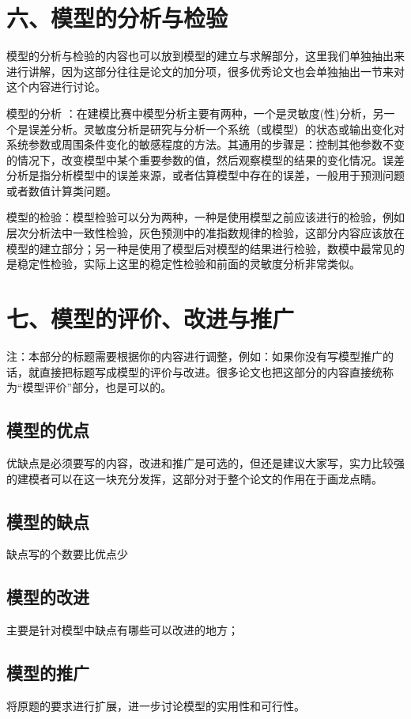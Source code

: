 \documentclass{my_paper}
\begin{document}
\section{六、模型的分析与检验}

模型的分析与检验的内容也可以放到模型的建立与求解部分，这里我们单独抽出来进行讲解，因为这部分往往是论文的加分项，很多优秀论文也会单独抽出一节来对这个内容进行讨论。

模型的分析 ：在建模比赛中模型分析主要有两种，一个是灵敏度(性)分析，另一个是误差分析。灵敏度分析是研究与分析一个系统（或模型）的状态或输出变化对系统参数或周围条件变化的敏感程度的方法。其通用的步骤是：控制其他参数不变的情况下，改变模型中某个重要参数的值，然后观察模型的结果的变化情况。误差分析是指分析模型中的误差来源，或者估算模型中存在的误差，一般用于预测问题或者数值计算类问题。

模型的检验：模型检验可以分为两种，一种是使用模型之前应该进行的检验，例如层次分析法中一致性检验，灰色预测中的准指数规律的检验，这部分内容应该放在模型的建立部分；另一种是使用了模型后对模型的结果进行检验，数模中最常见的是稳定性检验，实际上这里的稳定性检验和前面的灵敏度分析非常类似。

\section{七、模型的评价、改进与推广}
注：本部分的标题需要根据你的内容进行调整，例如：如果你没有写模型推广的话，就直接把标题写成模型的评价与改进。很多论文也把这部分的内容直接统称为“模型评价”部分，也是可以的。

\subsection{模型的优点}
优缺点是必须要写的内容，改进和推广是可选的，但还是建议大家写，实力比较强的建模者可以在这一块充分发挥，这部分对于整个论文的作用在于画龙点睛。
\subsection{模型的缺点}
缺点写的个数要比优点少
\subsection{模型的改进}
主要是针对模型中缺点有哪些可以改进的地方\cite{risken1996fokker}；
\subsection{模型的推广}
将原题的要求进行扩展\cite{rossler1979equation}，进一步讨论模型的实用性和可行性\cite{mckean1970nagumo}。
\end{document}
